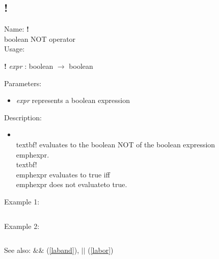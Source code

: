 \subsection{!}
\label{labnot}
\noindent Name: \textbf{!}\\
boolean NOT operator\\
\noindent Usage: 
\begin{center}
\textbf{!} \emph{expr} : \textsf{boolean} $\rightarrow$ \textsf{boolean}\\
\end{center}
Parameters: 
\begin{itemize}
\item \emph{expr} represents a boolean expression
\end{itemize}
\noindent Description: \begin{itemize}

\item \\textbf{!} evaluates to the boolean NOT of the boolean expression\n   \\emph{expr}. \\textbf{!} \\emph{expr} evaluates to true iff \\emph{expr} does not evaluate\n   to true.\n\end{itemize}
\noindent Example 1: 
\begin{center}\begin{minipage}{15cm}\begin{Verbatim}[frame=single]
\end{Verbatim}
\end{minipage}\end{center}
\noindent Example 2: 
\begin{center}\begin{minipage}{15cm}\begin{Verbatim}[frame=single]
\end{Verbatim}
\end{minipage}\end{center}
See also: \textbf{$\&\&$} (\ref{laband}), \textbf{$||$} (\ref{labor})

